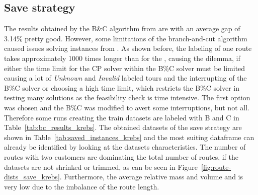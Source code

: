 \subsection{Save strategy}
\label{subsec:challenges_krebs_save}

The results obtained by the B\&C algorithm from \cite{tamke_branch-and-cut_2024} are with an average gap of 3.14\% pretty good. However, some limitations
of the branch-and-cut algorithm caused issues solving instances from \krebsADataSet. As shown before, the labeling of one route takes approximately
1000 times longer than for the \gendreauDataSet, causing the dilemma, if either the time limit for the \gls{CP} solver within the B\%C solver
must be limited causing a lot of \textit{Unknown} and \textit{Invalid} labeled tours and the interrupting of the B\%C solver or choosing
a high time limit, which restricts the B\%C solver in testing many solutions as the feasibility check is time intensive. The first option
was chosen and the B\%C was modified to avert some interruptions, but not all. Therefore some runs creating the train datasets are labeled with
B and C in Table~\ref{tab:bc_results_krebs}. The obtained datasets of the save strategy are shown in Table~\ref{tab:saved_instances_krebs}
and the most suiting dataframe can already be identified by looking at the datasets characteristics. The number of routes with two customers
are dominating the total number of routes, if the datasets are not shrinked or trimmed, as can be seen in Figure~\ref{fig:route-dists_save_krebs}. Furthermore, the average relative mass and volume and
is very low due to the imbalance of the route length.

